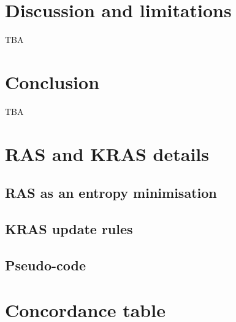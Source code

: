 \documentclass[11pt,a4paper]{article}
\begin{document}

\section{Discussion and limitations}
\label{sec:discussion}

TBA


\section{Conclusion}
\label{sec:conclusion}

TBA

\appendix

\section{RAS and KRAS details}
\label{app:kras}

\subsection{RAS as an entropy minimisation}


\subsection{KRAS update rules}


\subsection{Pseudo-code}


\section{Concordance table}
\label{app:concordance}



\end{document}
